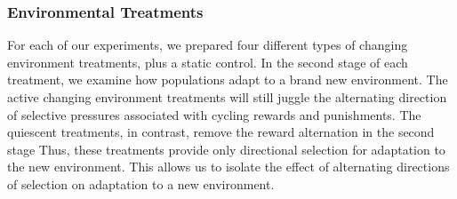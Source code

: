\documentclass[PhD]{msu-thesis}
\begin{document}
\subsubsection{Environmental Treatments}
For each of our experiments,
we prepared four different types of changing environment treatments, plus a static control. In the second stage of each treatment, we
examine how populations adapt to a brand new environment. The active changing environment treatments will still juggle the alternating direction of selective pressures associated with cycling rewards and punishments. The quiescent treatments, in contrast, remove the reward alternation in the second stage
Thus, these treatments provide only directional selection for adaptation to the new environment. This allows us to isolate the effect of alternating directions of selection on adaptation to a new environment. 
\end{document}
